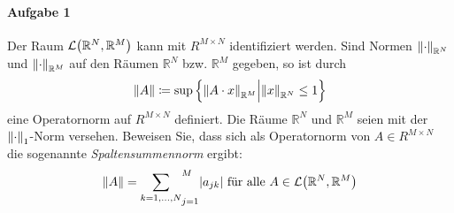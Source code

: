 \documentclass{scrreprt}
\begin{document}
\paragraph{Aufgabe 1} Der Raum $\mathcal{L}\qty(\mathbb{R}^N, \mathbb{R}^M)$ kann mit
$R^{M \times N}$ identifiziert werden.
Sind Normen $\norm{\cdot}_{\mathbb{R}^N}$ und
$\norm{\cdot}_{\mathbb{R}^M}$ auf den Räumen $\mathbb{R}^N$ bzw.
$\mathbb{R}^M$ gegeben, so ist durch
\[
  \norm{A} \coloneqq \sup\qty{ \norm{A \cdot x}_{\mathbb{R}^M} {\Big |} \norm{x}_{\mathbb{R}^N} \leq 1}
\]
eine Operatornorm auf $R^{M \times N}$ definiert.
Die Räume $\mathbb{R}^N$ und $\mathbb{R}^M$ seien mit der $\norm{\cdot}_1$-Norm
versehen.
Beweisen Sie, dass sich als Operatornorm von $A \in R^{M \times N}$ die
sogenannte \textit{Spaltensummennorm} ergibt:
\[
  \norm{A} = \underset{k=1,\ldots,N}\sum_{j=1}^M \abs{a_{jk}} \text{ für alle } A \in \mathcal{L}\qty(\mathbb{R}^N, \mathbb{R}^M)
\]
\end{document}
